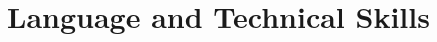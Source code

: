 \documentclass[10pt, oneside]{article}
\begin{document}
\begin{comment}
\section*{Certificate}
\begin{tabular}{p{2.1cm}|p{13cm}}	
	\toprule 
	Hong Kong Statistical Society & Higher Certificate\\
	& \footnotesize{TODO}
\end{tabular}
\end{comment}

\section*{Language and Technical Skills}
\end{document}
